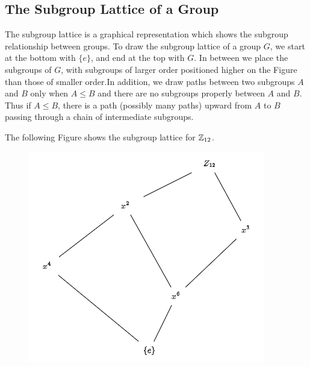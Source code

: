 \subsection{The Subgroup Lattice of a Group}

The subgroup lattice is a graphical representation which shows the subgroup relationship between groups. To draw the subgroup lattice of a group $G$, we start at the bottom with $\{e\}$, and end at the top with $G$. In between we place the subgroups of $G$, with subgroups of larger order positioned higher on the Figure than those of smaller order.In addition, we draw paths between two subgroups $A$ and $B$ only when $A \leq B$ and there are no subgroups properly between $A$ and $B$. Thus if $A \leq B$, there is a path (possibly many paths) upward from $A$ to $B$ passing through a chain of intermediate subgroups.

The following Figure shows the subgroup lattice for $\mathbb{Z}_{12}$.

\begin{figure}[H]
\centering
\includegraphics[scale=0.65]{images/2023-07-11_Z12_lattice.png}
\end{figure}





